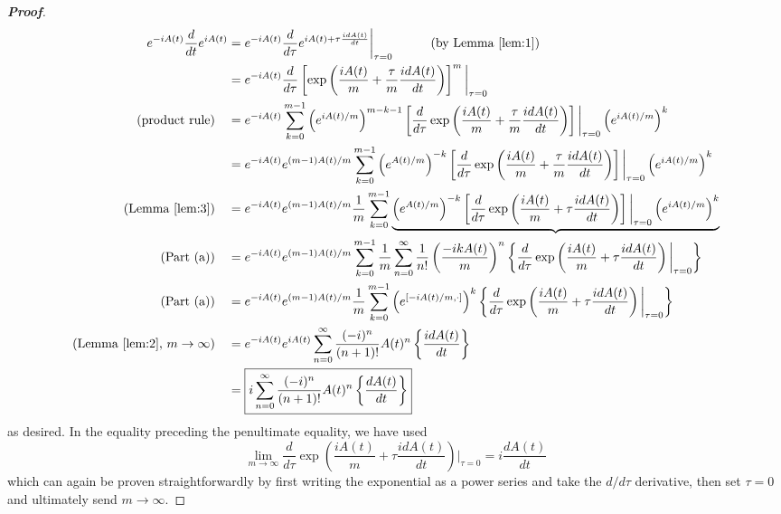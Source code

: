 \documentclass{article}
\theoremstyle{definition}
\newcommand{\f}[2]{\frac{#1}{#2}}
\newcommand{\lp}{\left(}
\newcommand{\rp}{\right)}
\newcommand{\lb}{\left[}
\newcommand{\rb}{\right]}
\newcommand{\lc}{\left\{}
\newcommand{\rc}{\right\}}
\begin{document}
\begin{enumerate}[label=(\alph*)]
	\begin{proof}[\textbf{Proof}]
		\begin{align*}
		e^{-iA(t)} \f{d}{dt} e^{iA(t)} 
		&= e^{-iA(t)}\f{d}{d\tau} e^{iA(t) + \tau \f{idA(t)}{dt}} \bigg\vert_{\tau = 0} \quad\quad\quad (\text{by Lemma \ref{lem:1}})\\
		&= e^{-iA(t)} \f{d}{d\tau} \lb \exp\lp \f{iA(t)}{m} + \f{\tau}{m} \f{idA(t)}{dt} \rp \rb^m \bigg\vert_{\tau = 0}\\
		\text{(product rule)}\quad&= e^{-iA(t)}
		\sum^{m-1}_{k=0}
		\lp e^{iA(t)/m}\rp^{m-k-1}
		\lb \f{d}{d\tau} 
		\exp \lp \f{iA(t)}{m} + \f{\tau}{m}\f{idA(t)}{dt} \rp  
		\rb \bigg\vert_{\tau = 0}
		\lp e^{iA(t)/m} \rp^k\\
		&= e^{-iA(t)}e^{(m-1)A(t)/m} \sum^{m-1}_{k=0} \lp e^{A(t)/m}\rp^{-k}
		\lb \f{d}{d\tau} 
		\exp \lp \f{iA(t)}{m} + \f{\tau}{m}\f{idA(t)}{dt} \rp  
		\rb \bigg\vert_{\tau = 0}
		\lp e^{iA(t)/m} \rp^k
		 \\
		 \text{(Lemma \ref{lem:3})}\quad &= e^{-iA(t)}e^{(m-1)A(t)/m} \f{1}{m} \sum^{m-1}_{k=0} \underbrace{\lp e^{A(t)/m}\rp^{-k}
		 \lb \f{d}{d\tau} 
		 \exp \lp \f{iA(t)}{m} + \tau\f{idA(t)}{dt} \rp  
		 \rb \bigg\vert_{\tau = 0}
		 \lp e^{iA(t)/m} \rp^k}\\
		 \text{(Part (a))}\quad
		 &= e^{-iA(t)}e^{(m-1)A(t)/m} \sum^{m-1}_{k=0} \f{1}{m} \sum^\infty_{n=0} \f{1}{n!} \lp \f{-ikA(t)}{m} \rp^n \lc  \f{d}{d\tau} 
		 \exp \lp \f{iA(t)}{m} + \tau\f{idA(t)}{dt} \rp  
		 \bigg\vert_{\tau = 0}  \rc\\
		 \text{(Part (a))}\quad 
		 &= e^{-iA(t)}e^{(m-1)A(t)/m} \f{1}{m}\sum^{m-1}_{k=0}
		 \lp e^{[-iA(t)/m,\cdot]} \rp^k
		 \lc  \f{d}{d\tau} 
		 \exp \lp \f{iA(t)}{m} + \tau\f{idA(t)}{dt} \rp  
		  \bigg\vert_{\tau = 0}  \rc\\
		 \text{(Lemma \ref{lem:2}, $m\to \infty$)}  \quad 
		 &= e^{-iA(t)} e^{iA(t)} \sum^\infty_{n=0}\f{(-i)^n}{(n+1)!}A(t)^n \lc \f{idA(t)}{dt} \rc\\
		 &= \boxed{i\sum^\infty_{n=0}\f{(-i)^n}{(n+1)!}A(t)^n \lc \f{dA(t)}{dt} \rc}
		\end{align*}
		as desired. In the equality preceding the penultimate equality, we have used 
		\begin{equation*}
		\lim_{m\to \infty}\f{d}{d\tau} 
		\exp \lp \f{iA(t)}{m} + \tau\f{idA(t)}{dt} \rp  
		\bigg\vert_{\tau = 0} = i\f{dA(t)}{dt}
		\end{equation*}
		which can again be proven straightforwardly by first writing the exponential as a power series and take the $d/d\tau$ derivative, then set $\tau = 0$ and ultimately send $m\to \infty$. 
	\end{proof}
	
\end{enumerate}
	
	
\end{document}
